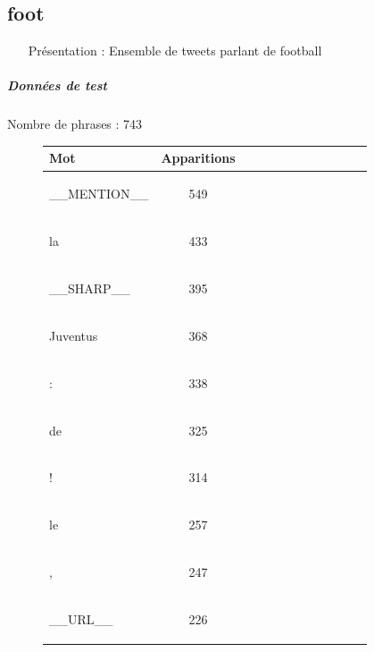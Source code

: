 \clearpage
\subsection{foot } 
 \begin{itemize} 
 \item[Présentation :] Ensemble de tweets parlant de football

 \end{itemize}  \subparagraph{Données de test \\ }  
 Nombre de phrases : 743\\ 
\begin{figure}[H] \begin{minipage}{0.48\textwidth} \centering \begin{tabular}{|l || *{11 }{|c} |} \hline
Mot & Apparitions  \\ \hline
\begin{verb} __MENTION__ \end{verb} &549\\ \hline
\begin{verb} la \end{verb} &433\\ \hline
\begin{verb} __SHARP__ \end{verb} &395\\ \hline
\begin{verb} Juventus \end{verb} &368\\ \hline
\begin{verb} : \end{verb} &338\\ \hline
\begin{verb} de \end{verb} &325\\ \hline
\begin{verb} ! \end{verb} &314\\ \hline
\begin{verb} le \end{verb} &257\\ \hline
\begin{verb} , \end{verb} &247\\ \hline
\begin{verb} __URL__ \end{verb} &226\\ \hline


\end{tabular}
\end{minipage}
\end{figure}
